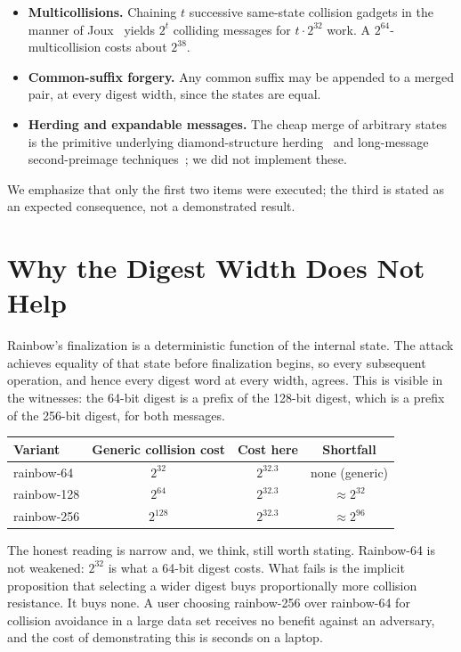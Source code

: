 \documentclass[10pt]{article}
\theoremstyle{definition}
\begin{document}
\begin{itemize}
  \item \textbf{Multicollisions.} Chaining $t$ successive same-state collision gadgets in the manner of Joux~\cite{joux2004} yields $2^t$ colliding messages for $t \cdot 2^{32}$ work. A $2^{64}$-multicollision costs about $2^{38}$.
  \item \textbf{Common-suffix forgery.} Any common suffix may be appended to a merged pair, at every digest width, since the states are equal.
  \item \textbf{Herding and expandable messages.} The cheap merge of arbitrary states is the primitive underlying diamond-structure herding~\cite{kelseykohno2006} and long-message second-preimage techniques~\cite{kelseyschneier2005}; we did not implement these.
\end{itemize}

We emphasize that only the first two items were executed; the third is stated as an expected consequence, not a demonstrated result.

\section{Why the Digest Width Does Not Help}
\label{sec:width}

Rainbow's finalization is a deterministic function of the internal state. The attack achieves equality of that state before finalization begins, so every subsequent operation, and hence every digest word at every width, agrees. This is visible in the witnesses: the 64-bit digest is a prefix of the 128-bit digest, which is a prefix of the 256-bit digest, for both messages.

\begin{center}
\begin{tabular}{@{}lccc@{}}
\toprule
Variant & Generic collision cost & Cost here & Shortfall \\
\midrule
rainbow-64  & $2^{32}$  & $2^{32.3}$ & none (generic) \\
rainbow-128 & $2^{64}$  & $2^{32.3}$ & $\approx 2^{32}$ \\
rainbow-256 & $2^{128}$ & $2^{32.3}$ & $\approx 2^{96}$ \\
\bottomrule
\end{tabular}
\end{center}

The honest reading is narrow and, we think, still worth stating. Rainbow-64 is not weakened: $2^{32}$ is what a 64-bit digest costs. What fails is the implicit proposition that selecting a wider digest buys proportionally more collision resistance. It buys none. A user choosing rainbow-256 over rainbow-64 for collision avoidance in a large data set receives no benefit against an adversary, and the cost of demonstrating this is seconds on a laptop.
\end{document}
